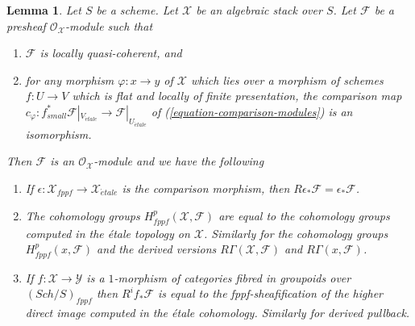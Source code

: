 \documentclass{stacks-project}
\theoremstyle{plain}
\newtheorem{lemma}[subsection]{Lemma}
\theoremstyle{definition}
\theoremstyle{remark}
\numberwithin{equation}{subsection}
\def\Sch{\mathit{Sch}}
\def\etale{{\acute{e}tale}}
\begin{document}
\begin{lemma}
\label{lemma-compare-fppf-etale}
Let $S$ be a scheme. Let $\mathcal{X}$ be an algebraic stack over $S$.
Let $\mathcal{F}$ be a presheaf $\mathcal{O}_\mathcal{X}$-module such that
\begin{enumerate}
\item[(a)] $\mathcal{F}$ is locally quasi-coherent, and
\item[(b)] for any morphism $\varphi : x \to y$ of $\mathcal{X}$ which lies
over a morphism of schemes $f : U \to V$ which is flat and
locally of finite presentation, the comparison map
$c_\varphi : f_{small}^*\mathcal{F}|_{V_\etale} \to
\mathcal{F}|_{U_\etale}$ of
(\ref{equation-comparison-modules}) is an isomorphism.
\end{enumerate}
Then $\mathcal{F}$ is an $\mathcal{O}_\mathcal{X}$-module and
we have the following
\begin{enumerate}
\item If $\epsilon : \mathcal{X}_{fppf} \to \mathcal{X}_\etale$
is the comparison morphism, then
$R\epsilon_*\mathcal{F} = \epsilon_*\mathcal{F}$.
\item The cohomology groups $H^p_{fppf}(\mathcal{X}, \mathcal{F})$ are equal
to the cohomology groups computed in the \'etale topology on $\mathcal{X}$.
Similarly for the cohomology groups $H^p_{fppf}(x, \mathcal{F})$ and the
derived versions $R\Gamma(\mathcal{X}, \mathcal{F})$ and
$R\Gamma(x, \mathcal{F})$.
\item If $f : \mathcal{X} \to \mathcal{Y}$ is a $1$-morphism of
categories fibred in groupoids over $(\Sch/S)_{fppf}$ then
$R^if_*\mathcal{F}$ is equal to the fppf-sheafification of the
higher direct image computed in the \'etale cohomology.
Similarly for derived pullback.
\end{enumerate}
\end{lemma}
\end{document}
